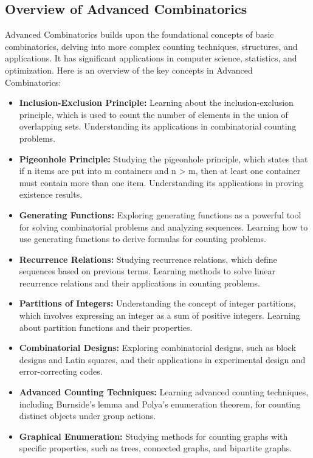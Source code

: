 \documentclass[openany]{book}
\begin{document}
\subsection{Overview of Advanced Combinatorics}
Advanced Combinatorics builds upon the foundational concepts of basic combinatorics, delving into more complex counting techniques, structures, and applications. It has significant applications in computer science, statistics, and optimization. Here is an overview of the key concepts in Advanced Combinatorics:
\begin{itemize}
    \item \textbf{Inclusion-Exclusion Principle:} Learning about the inclusion-exclusion principle, which is used to count the number of elements in the union of overlapping sets. Understanding its applications in combinatorial counting problems.
    \item \textbf{Pigeonhole Principle:} Studying the pigeonhole principle, which states that if n items are put into m containers and n > m, then at least one container must contain more than one item. Understanding its applications in proving existence results.
    \item \textbf{Generating Functions:} Exploring generating functions as a powerful tool for solving combinatorial problems and analyzing sequences. Learning how to use generating functions to derive formulas for counting problems.
    \item \textbf{Recurrence Relations:} Studying recurrence relations, which define sequences based on previous terms. Learning methods to solve linear recurrence relations and their applications in counting problems.
    \item \textbf{Partitions of Integers:} Understanding the concept of integer partitions, which involves expressing an integer as a sum of positive integers. Learning about partition functions and their properties.
    \item \textbf{Combinatorial Designs:} Exploring combinatorial designs, such as block designs and Latin squares, and their applications in experimental design and error-correcting codes.
    \item \textbf{Advanced Counting Techniques:} Learning advanced counting techniques, including Burnside's lemma and Polya's enumeration theorem, for counting distinct objects under group actions.
    \item \textbf{Graphical Enumeration:} Studying methods for counting graphs with specific properties, such as trees, connected graphs, and bipartite graphs.

\end{itemize}
\end{document}
